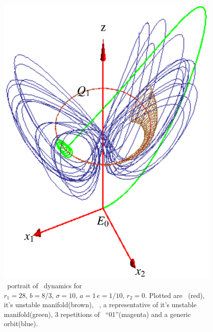 \begin{figure}[ht]
\begin{center}
  \includegraphics[height=0.25\textheight]{../figs/CLE.eps}
\end{center}
\caption[Complex Lorenz system phase space]
{ \Statesp\ portrait of \CLe\ dynamics for $r_1=28,\, b=8/3,\,
\sigma=10,\, a=1\, e=1/10,\, r_2=0$. Plotted are \reqv\
(red), it's unstable manifold(brown), \eqv\ , a
representative of it's unstable manifold(green), 3 repetitions
of \rpo\ ``01''(magenta) and a generic orbit(blue).}
\label{fig:CLE}
\end{figure}

